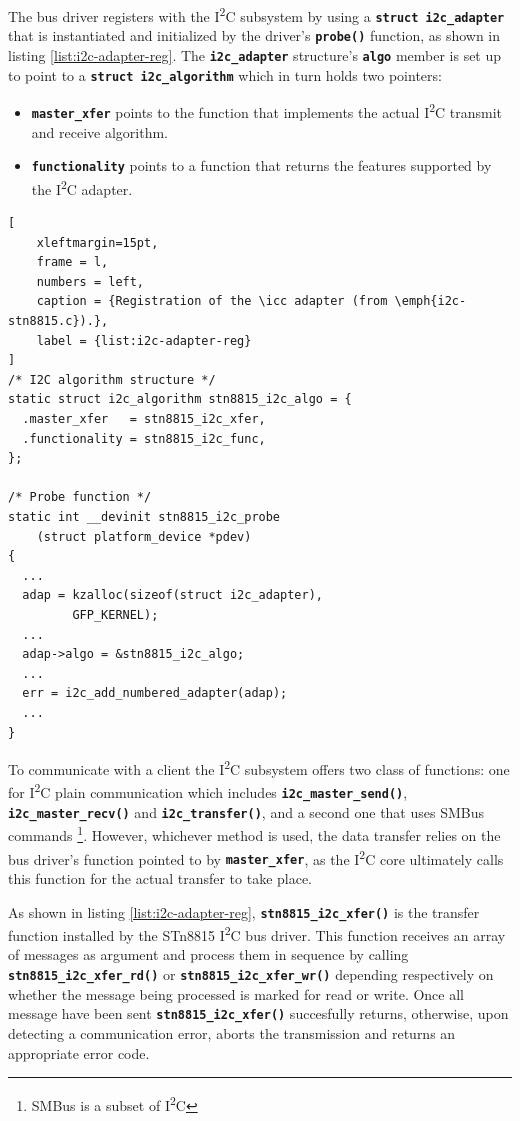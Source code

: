 \documentclass[a4paper,10pt]{article}
\newenvironment{packeditems}{
\begin{itemize}
  \setlength{\itemsep}{3pt}
  \setlength{\parskip}{0pt}
  \setlength{\parsep}{0pt}
}{\end{itemize}}
\newcommand{\icc}{I\textsuperscript{2}C }
\newcommand{\keyword}[1]{\texttt{\textbf{#1}}}
\begin{document}
\begin{multicols}{2}
The bus driver registers with the \icc subsystem by using a
\keyword{struct i2c\_adapter} that is instantiated and initialized by the
driver's \keyword{probe()} function, as shown in listing
\ref{list:i2c-adapter-reg}.
The \keyword{i2c\_adapter} structure's \keyword{algo} member is set up to
point to a \keyword{struct i2c\_algorithm} which in turn holds two pointers:
\begin{packeditems}
	\item \keyword{master\_xfer} points to the function that implements the
		actual \icc transmit and receive algorithm.
	\item \keyword{functionality} points to a function that returns the
		features supported by the \icc adapter.
\end{packeditems}

\begin{lstlisting}[
	xleftmargin=15pt,
	frame = l,
	numbers = left,
	caption = {Registration of the \icc adapter (from \emph{i2c-stn8815.c}).},
	label = {list:i2c-adapter-reg}
]
/* I2C algorithm structure */
static struct i2c_algorithm stn8815_i2c_algo = {
  .master_xfer   = stn8815_i2c_xfer,
  .functionality = stn8815_i2c_func,
};

/* Probe function */
static int __devinit stn8815_i2c_probe
	(struct platform_device *pdev)
{
  ...
  adap = kzalloc(sizeof(struct i2c_adapter),
         GFP_KERNEL);
  ...
  adap->algo = &stn8815_i2c_algo;
  ...
  err = i2c_add_numbered_adapter(adap);
  ...
}
\end{lstlisting}

To communicate with a client the \icc subsystem offers two class of functions:
one for \icc plain communication which includes \keyword{i2c\_master\_send()},
\keyword{i2c\_master\_recv()} and \keyword{i2c\_transfer()}, and a second one
that uses SMBus commands
\footnote{SMBus is a subset of \icc}.
However, whichever method is used, the data transfer relies on the bus driver's
function pointed to by \keyword{master\_xfer}, as the \icc core ultimately calls
this function for the actual transfer to take place.

As shown in listing \ref{list:i2c-adapter-reg}, \keyword{stn8815\_i2c\_xfer()}
is the transfer function installed by the STn8815 \icc bus driver.
This function receives an array of messages as argument and process
them in sequence by calling \keyword{stn8815\_i2c\_xfer\_rd()} or
\keyword{stn8815\_i2c\_xfer\_wr()} depending respectively on whether the message
being processed is marked for read or write.
Once all message have been sent \keyword{stn8815\_i2c\_xfer()} succesfully
returns, otherwise, upon detecting a communication error, aborts the transmission
and returns an appropriate error code.


\end{multicols}
\end{document}
